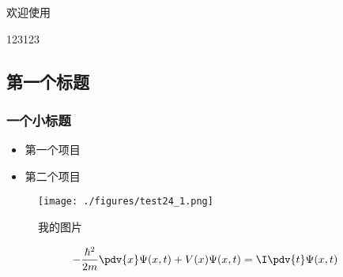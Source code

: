 
欢迎使用

123123

\subsection{第一个标题}
\subsubsection{一个小标题}

\begin{itemize}
\item 第一个项目
\item 第二个项目
\end{itemize}

\begin{figure}[ht]
\centering
\texttt{[image: ./figures/test24\_1.png]}
\caption{我的图片} \label{test24_fig1}
\end{figure}

\begin{equation}
-\frac{\hbar^2}{2m}\pdv{x}\Psi(x, t) + V(x) \Psi(x,t) = \I\pdv{t}\Psi(x,t)
\end{equation}
